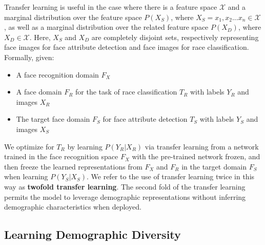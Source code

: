 \documentclass{article}
\begin{document}
Transfer learning is useful in the case where there is a feature space $\mathcal{X}$ and a marginal distribution over the feature space $P(X_S)$, where $X_S=x_1,x_2 ... x_n \in \mathcal{X}$, as well as a marginal distribution over the related feature space $P(X_D)$, where $X_D \in \mathcal{X}$.  Here, $X_S$ and $X_D$ are completely disjoint sets, respectively representing face images for face attribute detection and face images for race classification.  Formally, given:\vspace{-1em}
\begin{itemize}
\item A face recognition domain $F_X$\vspace{-.5em}
\item A face domain $F_R$ for the task of race classification $T_R$ with labels $Y_R$ and images $X_R$\vspace{-.5em}
\item The target face domain $F_S$ for face attribute detection $T_S$ with labels $Y_S$ and images $X_S$\vspace{-.5em}
\end{itemize}

We optimize for $T_R$ by learning $P(Y_R|X_R)$ via transfer learning from a network trained in the face recognition space $F_X$ with the pre-trained network frozen, and then freeze the learned representations from $F_X$ and $F_R$ in the target domain $F_S$ when learning $P(Y_S|X_S)$. We refer to the use of transfer learning twice in this way as \textbf{twofold transfer learning}.  The second fold of the transfer learning permits the model to leverage demographic representations without inferring demographic characteristics when deployed.\vspace{-.5em}

\subsection{Learning Demographic Diversity} \label{sec:sampling}


\end{document}
